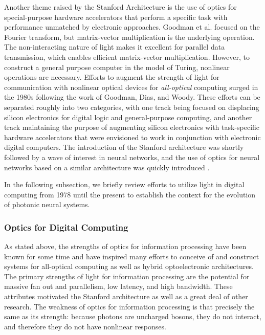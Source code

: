 Another theme raised by the Stanford Architecture is the use of optics for special-purpose hardware accelerators that perform a specific task with performance unmatched by electronic approaches. Goodman et al. focused on the Fourier transform, but matrix-vector multiplication is the underlying operation. The non-interacting nature of light makes it excellent for parallel data transmission, which enables efficient matrix-vector multiplication. However, to construct a general purpose computer in the model of Turing, nonlinear operations are necessary. Efforts to augment the strength of light for communication with nonlinear optical devices for \textit{all-optical} computing surged in the 1980s following the work of Goodman, Dias, and Woody. These efforts can be separated roughly into two categories, with one track being focused on displacing silicon electronics for digital logic and general-purpose computing, and another track maintaining the purpose of augmenting silicon electronics with task-specific hardware accelerators that were envisioned to work in conjunction with electronic digital computers. The introduction of the Stanford architecture was shortly followed by a wave of interest in neural networks, and the use of optics for neural networks based on a similar architecture was quickly introduced \cite{psfa1985}.

In the following subsection, we briefly review efforts to utilize light in digital computing from 1978 until the present to establish the context for the evolution of photonic neural systems.

\subsubsection{Optics for Digital Computing}
As stated above, the strengths of optics for information processing have been known for some time and have inspired many efforts to conceive of and construct systems for all-optical computing as well as hybrid optoelectronic architectures. The primary strengths of light for information processing are the potential for massive fan out and parallelism, low latency, and high bandwidth. These attributes motivated the Stanford architecture as well as a great deal of other research. The weakness of optics for information processing is that precisely the same as its strength: because photons are uncharged bosons, they do not interact, and therefore they do not have nonlinear responses. 


\cite{absm1982}

